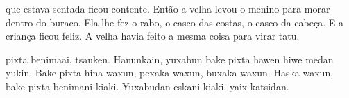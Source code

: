 
 que estava
sentada ficou contente.
Então a velha levou o menino
para morar dentro do buraco.
Ela lhe fez o rabo, o casco das
costas, o casco da cabeça.
E a criança ficou feliz.
A velha havia feito a mesma
coisa para virar tatu.

\vspace{2em}

 pixta benimaai, tsauken.
Hanunkain, yuxabun bake pixta
hawen hiwe medan yukin.
Bake pixta hina waxun, pexaka
waxun, buxaka waxun.
Haska waxun, bake pixta
benimani kiaki.
Yuxabudan eskani kiaki,
yaix katsidan.

\vspace*{\fill}

